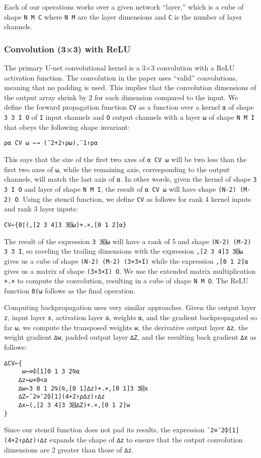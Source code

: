 \documentclass[10pt,twocolumn,english,format=sigplan,screen,balance]{acmart}
\begin{document}
Each of our operations works over a given network “layer,” which
is a cube of shape \texttt{N M C} where \texttt{N M} are the layer
dimensions and \texttt{C} is the number of layer channels. 

\subsubsection{Convolution (3×3) with ReLU}

The primary U-net convolutional kernel is a 3×3 convolution with a
ReLU activation function. The convolution in the paper uses “valid”
convolutions, meaning that no padding is used. This implies that the
convolution dimensions of the output array shrink by 2 for each dimension
compared to the input. We define the forward propagation function
\texttt{CV} as a function over a kernel \texttt{⍺} of shape \texttt{3
3 I O} of \texttt{I} input channels and \texttt{O} output channels
with a layer \texttt{⍵} of shape \texttt{N M I} that obeys the following
shape invariant:
\begin{verbatim}
⍴⍺ CV ⍵ ←→ (¯2+2↑⍴⍵),¯1↑⍴⍺
\end{verbatim}
This says that the size of the first two axes of \texttt{⍺ CV ⍵} will
be two less than the first two axes of \texttt{⍵}, while the remaining
axis, corresponding to the output channels, will match the last axis
of \texttt{⍺}. In other words, given the kernel of shape \texttt{3
3 I O} and layer of shape \texttt{N M I}, the result of \texttt{⍺
CV ⍵} will have shape \texttt{(N-2) (M-2) O}. Using the stencil function,
we define \texttt{CV} as follows for rank 4 kernel inputs and rank
3 layer inputs:
\begin{verbatim}
CV←{0⌈(,[2 3 4]3 3⌺⍵)+.×,[0 1 2]⍺}
\end{verbatim}
The result of the expression \texttt{3 3⌺⍵} will have a rank of 5
and shape \texttt{(N-2) (M-2) 3 3 I}, so raveling the trailing dimensions
with the expression \texttt{,{[}2 3 4{]}3 3⌺⍵} gives us a cube of
shape \texttt{(N-2) (M-2) (3×3×I)} while the expression \texttt{,{[}0
1 2{]}⍺} gives us a matrix of shape \texttt{(3×3×I) O}. We use the
extended matrix multiplication \texttt{+.×} to compute the convolution,
resulting in a cube of shape \texttt{N M O}. The ReLU function \texttt{0⌈⍵}
follows as the final operation. 

Computing backpropagation uses very similar approaches. Given the
output layer \texttt{z}, input layer \texttt{x}, activation layer
\texttt{a}, weights \texttt{⍺}, and the gradient backpropagated so
far \texttt{⍵}, we compute the transposed weights \texttt{w}, the
derivative output layer \texttt{∆z}, the weight gradient \texttt{∆w},
padded output layer \texttt{∆Z}, and the resulting back gradient \texttt{∆x}
as follows:
\begin{verbatim}
∆CV←{
     w←⊖⌽[1]0 1 3 2⍉⍺
    ∆z←⍵×0<a
    ∆w←3 0 1 2⍉(⍉,[0 1]∆z)+.×,[0 1]3 3⌺x
    ∆Z←¯2⊖¯2⌽[1](4+2↑⍴∆z)↑∆z
    ∆x←(,[2 3 4]3 3⌺∆Z)+.×,[0 1 2]w
}
\end{verbatim}
Since our stencil function does not pad its results, the expression
\texttt{¯2⊖¯2⌽{[}1{]}(4+2↑⍴∆z)↑∆z} expands the shape of \texttt{∆z}
to ensure that the output convolution dimensions are 2 greater than
those of \texttt{∆z}.
\end{document}
